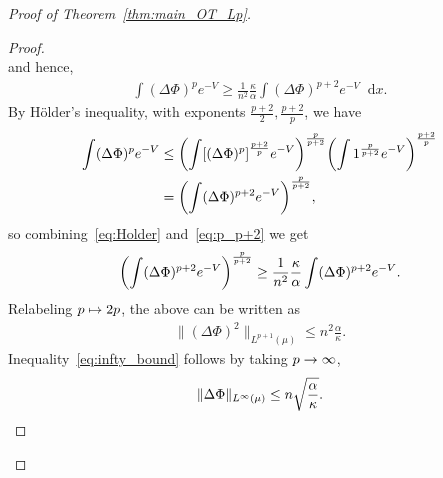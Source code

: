 \documentclass[AHL,Unicode,longabstracts]{cedram}
\newcommand{\dd}{n}
\newcommand{\source}{\mu}
\newcommand{\lsh}{\alpha}
\newcommand{\lc}{\kappa}
\newcommand*\diff{\mathop{}\!\mathrm{d}}
\newcommand{\OT}{\Phi}
\renewcommand*{\to}{\mathchoice{\longrightarrow}{\rightarrow}{\rightarrow}{\rightarrow}}
\let\oldmapsto\mapsto
\renewcommand*{\mapsto}{\mathchoice{\longmapsto}{\oldmapsto}{\oldmapsto}{\oldmapsto}}
\let\originalleft\left
\let\originalright\right
\renewcommand{\left}{\mathopen{}\mathclose\bgroup\originalleft}
\renewcommand{\right}{\aftergroup\egroup\originalright}
\begin{document}
\begin{proof}[Proof of Theorem~\ref{thm:main_OT_Lp}]
\begin{proof}
\[\]
and hence,
\begin{align}\label{eq:p_p+2}
\int (\Delta \OT)^p e^{-V}\ge\frac{1}{\dd^2} \frac{\lc}{\lsh} \int (\Delta \OT)^{p+2} e^{-V}\diff x.
\end{align}
By H\"older's inequality, with exponents $\frac{p+2}{2},\frac{p+2}{p}$, we have
\begin{equation}\label{eq:Holder}
\begin{aligned}
\int (\Delta \OT)^p e^{-V}&\le \left(\int \left[(\Delta \OT)^p\right]^{\frac{p+2}{p}} e^{-V} \right)^{\frac{p}{p+2}}\left(\int 1^{\frac{p}{p+2}}e^{-V}\right)^{\frac{p+2}{p}}\\
&=\left(\int (\Delta\OT)^{p+2}e^{-V}\right)^{\frac{p}{p+2}},
\end{aligned}
\end{equation}
so combining~\eqref{eq:Holder} and~\eqref{eq:p_p+2} we get
\[
\left(\int (\Delta\OT)^{p+2}e^{-V}\right)^{\frac{p}{p+2}}\ge \frac{1}{\dd^2}\frac{\lc}{\lsh} \int (\Delta \OT)^{p+2} e^{-V}.
\]
Relabeling $p\mapsto 2p$, the above can be written as
\begin{align}\label{eq:q_bound_proof}
\|(\Delta\OT)^2\|_{L^{p+1}(\source)}\le\dd^2 \frac{\lsh}{\lc}.
\end{align}
Inequality~\eqref{eq:infty_bound} follows by taking $p\to\infty$,
\begin{equation}\label{eq:infty_bound_proof}
\|\Delta\OT\|_{L^{\infty}(\source)}\le \dd\sqrt{ \frac{\lsh}{\lc}}.\qedhere
\end{equation}
\end{proof}


\end{proof}
\end{document}

